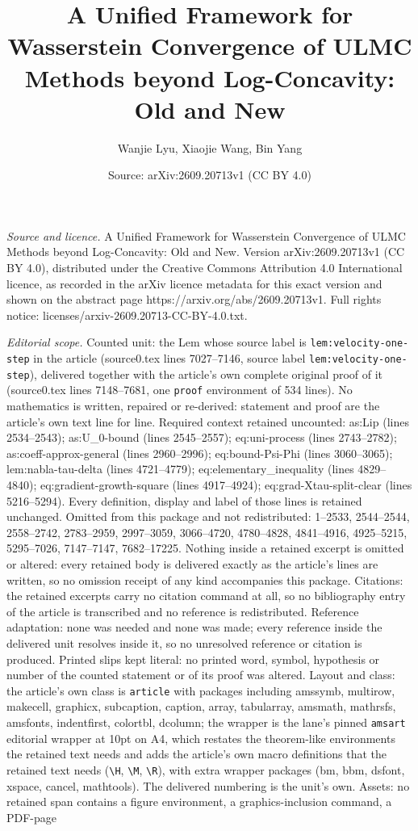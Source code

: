\documentclass[10pt,a4paper]{amsart}
\title[A Unified Framework for Wasserstein Convergence of ULMC Meth]{A Unified Framework for Wasserstein Convergence of ULMC Methods beyond Log-Concavity: Old and New}
\author{Wanjie Lyu, Xiaojie Wang, Bin Yang}
\date{Source: arXiv:2609.20713v1 (CC BY 4.0)}
\begin{document}
\maketitle

\noindent\emph{Source and licence.} A Unified Framework for Wasserstein Convergence of ULMC Methods beyond Log-Concavity: Old and New. Version arXiv:2609.20713v1 (CC BY 4.0), distributed under the Creative Commons Attribution 4.0 International licence, as recorded in the arXiv licence metadata for this exact version and shown on the abstract page https://arxiv.org/abs/2609.20713v1. Full rights notice: licenses/arxiv-2609.20713-CC-BY-4.0.txt.\par\smallskip

\noindent\textit{Editorial scope.} Counted unit: the Lem whose source label is \texttt{lem:velocity-one-step} in the article (source0.tex lines 7027--7146, source label \texttt{lem:velocity-one-step}), delivered together with the article's own complete original proof of it (source0.tex lines 7148--7681, one \texttt{proof} environment of 534 lines). No mathematics is written, repaired or re-derived: statement and proof are the article's own text line for line. Required context retained uncounted: as:Lip (lines 2534--2543); as:U\_0-bound (lines 2545--2557); eq:uni-process (lines 2743--2782); as:coeff-approx-general (lines 2960--2996); eq:bound-Psi-Phi (lines 3060--3065); lem:nabla-tau-delta (lines 4721--4779); eq:elementary\_inequality (lines 4829--4840); eq:gradient-growth-square (lines 4917--4924); eq:grad-Xtau-split-clear (lines 5216--5294). Every definition, display and label of those lines is retained unchanged. Omitted from this package and not redistributed: 1--2533, 2544--2544, 2558--2742, 2783--2959, 2997--3059, 3066--4720, 4780--4828, 4841--4916, 4925--5215, 5295--7026, 7147--7147, 7682--17225. Nothing inside a retained excerpt is omitted or altered: every retained body is delivered exactly as the article's lines are written, so no omission receipt of any kind accompanies this package. Citations: the retained excerpts carry no citation command at all, so no bibliography entry of the article is transcribed and no reference is redistributed. Reference adaptation: none was needed and none was made; every reference inside the delivered unit resolves inside it, so no unresolved reference or citation is produced. Printed slips kept literal: no printed word, symbol, hypothesis or number of the counted statement or of its proof was altered. Layout and class: the article's own class is \texttt{article} with packages including amssymb, multirow, makecell, graphicx, subcaption, caption, array, tabularray, amsmath, mathrsfs, amsfonts, indentfirst, colortbl, dcolumn; the wrapper is the lane's pinned \texttt{amsart} editorial wrapper at 10pt on A4, which restates the theorem-like environments the retained text needs and adds the article's own macro definitions that the retained text needs (\texttt{\textbackslash H}, \texttt{\textbackslash M}, \texttt{\textbackslash R}), with extra wrapper packages (bm, bbm, dsfont, xspace, cancel, mathtools). The delivered numbering is the unit's own. Assets: no retained span contains a figure environment, a graphics-inclusion command, a PDF-page 
\end{document}
